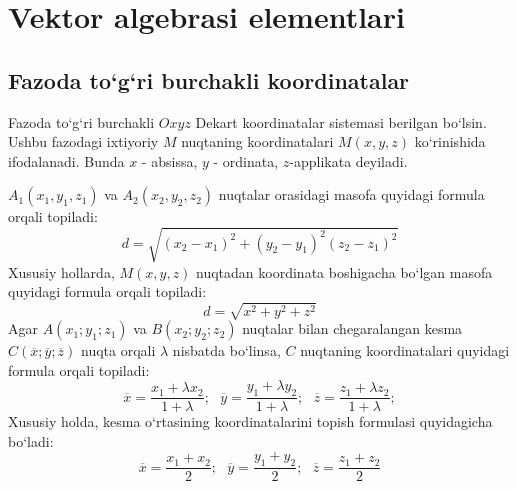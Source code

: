 \chapter{Vektor algebrasi elementlari}
\section{Fazoda to`g`ri burchakli koordinatalar}
\hspace{0.6cm}Fazoda to`g`ri burchakli $Oxyz$ Dekart koordinatalar sistemasi berilgan bo`lsin. Ushbu fazodagi ixtiyoriy $M$ nuqtaning koordinatalari $M(x,y,z)$ ko`rinishida ifodalanadi. Bunda $x$ - absissa, $y$ - ordinata, $z$-applikata deyiladi.

$A_{1}(x_{1},y_{1}, z_{1})$ va $A_{2}(x_{2},y_{2}, z_2)$ nuqtalar orasidagi masofa quyidagi formula orqali topiladi:
\begin{equation}
	d=\sqrt{(x_{2}-x_{1})^{2}+(y_{2}-y_{1})^{2}(z_2-z_1)^2}
	\label{2.1}
\end{equation}
Xususiy hollarda, $M(x,y,z)$ nuqtadan koordinata boshigacha bo`lgan masofa quyidagi formula orqali topiladi:
\begin{equation}
	d=\sqrt{x^{2}+y^{2}+z^2}
	\label{2.2}
\end{equation}
Agar $A(x_1;y_1;z_1)$ va $B(x_2;y_2;z_2)$ nuqtalar bilan chegaralangan kesma $C(\overline x;\overline y; \overline z)$ nuqta orqali $\lambda$ nisbatda bo`linsa, $C$ nuqtaning koordinatalari quyidagi formula orqali topiladi:
\begin{equation}
	\overline x=\frac{x_{1}+\lambda x_2}{1+\lambda};\ \ \ \overline y=\frac{y_{1}+\lambda y_2}{1+\lambda};\ \ \ \overline z=\frac{z_{1}+\lambda z_2}{1+\lambda};
	\label{2.3} 
\end{equation}
Xususiy holda, kesma o`rtasining koordinatalarini topish formulasi quyidagicha bo`ladi:
\begin{equation}
	\overline x=\frac{x_1+x_2}{2};\ \ \ \overline y=\frac{y_1+y_2}{2};\ \ \ \overline z=\frac{z_1+z_2}{2}
	\label{2.4}
\end{equation}

